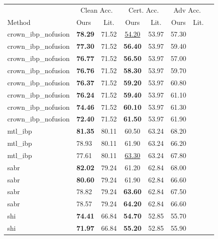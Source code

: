 \begin{tabular}{llcccccc}
\toprule
 & \multicolumn{2}{c}{Clean Acc.} & \multicolumn{2}{c}{Cert. Acc.} & \multicolumn{2}{c}{Adv Acc.} \\
Method & Ours & Lit. & Ours & Lit. & Ours & Lit. \\
\midrule
crown\_ibp\_nofusion & \textbf{78.29} & 71.52 & \underline{54.20} & 53.97 & 57.30 & \\
crown\_ibp\_nofusion & \textbf{77.30} & 71.52 & \textbf{56.40} & 53.97 & 59.40 & \\
crown\_ibp\_nofusion & \textbf{76.77} & 71.52 & \textbf{56.50} & 53.97 & 57.00 & \\
crown\_ibp\_nofusion & \textbf{76.76} & 71.52 & \textbf{58.30} & 53.97 & 59.70 & \\
crown\_ibp\_nofusion & \textbf{76.37} & 71.52 & \textbf{59.20} & 53.97 & 60.80 & \\
crown\_ibp\_nofusion & \textbf{76.24} & 71.52 & \textbf{59.40} & 53.97 & 61.10 & \\
crown\_ibp\_nofusion & \textbf{74.46} & 71.52 & \textbf{60.10} & 53.97 & 61.30 & \\
crown\_ibp\_nofusion & \textbf{72.40} & 71.52 & \textbf{61.50} & 53.97 & 61.90 & \\
mtl\_ibp & \textbf{81.35} & 80.11 & 60.50 & 63.24 & 68.20 & \\
mtl\_ibp & 78.93 & 80.11 & 61.90 & 63.24 & 66.20 & \\
mtl\_ibp & 77.61 & 80.11 & \underline{63.30} & 63.24 & 67.80 & \\
sabr & \textbf{82.02} & 79.24 & 61.20 & 62.84 & 68.00 & \\
sabr & \textbf{80.60} & 79.24 & 61.90 & 62.84 & 66.60 & \\
sabr & 78.82 & 79.24 & \textbf{63.60} & 62.84 & 67.50 & \\
sabr & 78.57 & 79.24 & \textbf{64.20} & 62.84 & 66.60 & \\
shi & \textbf{74.41} & 66.84 & \textbf{54.70} & 52.85 & 55.70 & \\
shi & \textbf{71.97} & 66.84 & \textbf{55.20} & 52.85 & 55.90 & \\
\bottomrule
\end{tabular}